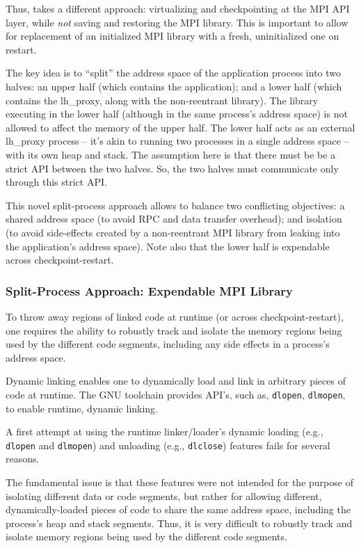 \documentclass[11pt,letter]{article}
\begin{document}
Thus, \mpiSol{} takes a different approach: virtualizing and checkpointing at the
MPI API layer, while {\em not} saving and restoring the MPI library.
This is important to allow for replacement of an initialized MPI library
with a fresh, uninitialized one on restart.


The key idea is to ``split'' the
address space of the application process into two halves: an upper
half (which contains the application); and a lower half (which
contains the lh\_proxy, along with the non-reentrant library). The
library executing in the lower half (although in the same process's
address space) is not allowed to affect the memory of the upper
half. The lower half acts as an external lh\_proxy process -- it's
akin to running two processes in a single address space -- with its
own heap and stack. The assumption here is that there must be
be a strict API between the two halves. So, the two halves must
communicate only through this strict API.

This novel split-process approach allows \mpiSol{} to balance two
conflicting objectives: a shared address space (to avoid RPC and
data transfer overhead); and isolation (to avoid side-effects created
by a non-reentrant MPI library from leaking into the application's
address space). Note also that the lower half is expendable across
checkpoint-restart.

\subsubsection{Split-Process Approach: Expendable MPI Library}

To throw away regions of linked code at runtime (or across
checkpoint-restart), one requires the ability to robustly track and isolate
the memory regions being used by the different code segments, including any
side effects in a process's address space.

Dynamic linking enables one to dynamically load and link in arbitrary
pieces of code at runtime. The GNU toolchain provides API's, such as,
\texttt{dlopen}, \texttt{dlmopen}, to enable runtime, dynamic linking.

A first attempt at using the runtime linker/loader's dynamic loading
(e.g., \texttt{dlopen} and \texttt{dlmopen}) and unloading (e.g.,
\texttt{dlclose}) features fails for several reasons.

The fundamental issue is that these features were not intended for the
purpose of isolating different data or code segments, but rather for allowing
different, dynamically-loaded pieces of code to share the same address space,
including the process's heap and stack segments. Thus, it is very difficult
to robustly track and isolate memory regions being used by the different
code segments.
\end{document}
